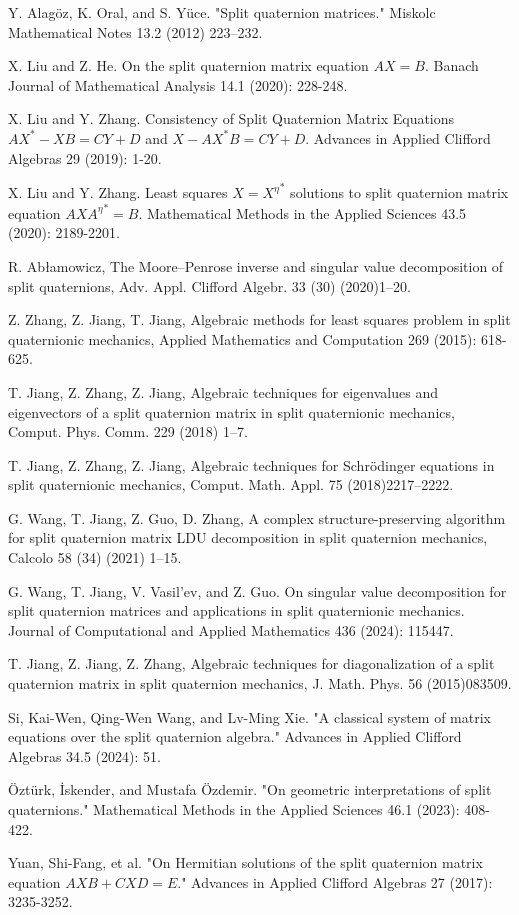 \documentclass[1p]{elsarticle}
\numberwithin{equation}{section}
\begin{document}
\begin{thebibliography}{99}
 Y. Alag\"oz, K. Oral, and S. Y\"uce. "Split quaternion matrices." Miskolc Mathematical Notes 13.2 (2012) 223–232.

 X. Liu and Z. He. On the split quaternion matrix equation $AX= B$. Banach Journal
of Mathematical Analysis 14.1 (2020): 228-248.

 X. Liu and Y. Zhang. Consistency of Split Quaternion Matrix Equations $AX^* - XB = CY + D$ and $X - AX^*B = CY + D$. Advances in Applied Clifford Algebras 29 (2019): 1-20.


 X. Liu and Y. Zhang. Least squares \(X = {X^{\eta}}^* \) solutions to split quaternion matrix equation \(AX{A^{\eta}}^*= B\). Mathematical Methods in the Applied Sciences 43.5 (2020): 2189-2201.


 R. Abłamowicz, The Moore–Penrose inverse and singular value decomposition of split quaternions, Adv. Appl. Clifford Algebr. 33 (30) (2020)1–20.

 Z. Zhang, Z. Jiang, T. Jiang, Algebraic methods for least squares problem in split quaternionic mechanics, Applied Mathematics and Computation 269 (2015): 618-625.

T. Jiang, Z. Zhang, Z. Jiang, Algebraic techniques for eigenvalues and eigenvectors of a split quaternion matrix in split quaternionic mechanics,
Comput. Phys. Comm. 229 (2018) 1–7.

T. Jiang, Z. Zhang, Z. Jiang, Algebraic techniques for Schrödinger equations in split quaternionic mechanics, Comput. Math. Appl. 75 (2018)2217–2222.

G. Wang, T. Jiang, Z. Guo, D. Zhang, A complex structure-preserving algorithm for split quaternion matrix LDU decomposition in split quaternion
mechanics, Calcolo 58 (34) (2021) 1–15.

G. Wang, T. Jiang, V. Vasil’ev, and Z. Guo. On singular value decomposition for split quaternion matrices and applications in split quaternionic mechanics. Journal of Computational and Applied Mathematics 436 (2024): 115447.

 T. Jiang, Z. Jiang, Z. Zhang, Algebraic techniques for diagonalization of a split quaternion matrix in split quaternion mechanics, J. Math. Phys. 56 (2015)083509.

Si, Kai-Wen, Qing-Wen Wang, and Lv-Ming Xie. "A classical system of matrix equations over the split quaternion algebra." Advances in Applied Clifford Algebras 34.5 (2024): 51.

Öztürk, İskender, and Mustafa Özdemir. "On geometric interpretations of split quaternions." Mathematical Methods in the Applied Sciences 46.1 (2023): 408-422.

Yuan, Shi-Fang, et al. "On Hermitian solutions of the split quaternion matrix equation $AXB+CXD=E$." Advances in Applied Clifford Algebras 27 (2017): 3235-3252.


\end{thebibliography}
\end{document}
